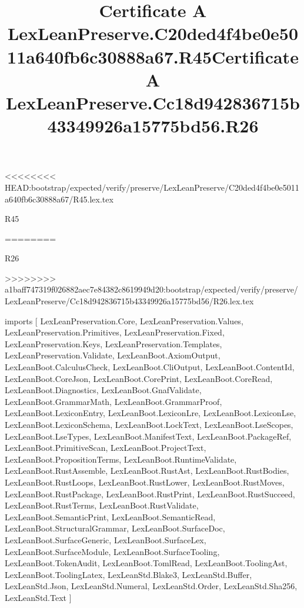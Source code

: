<<<<<<<< HEAD:bootstrap/expected/verify/preserve/LexLeanPreserve/C20ded4f4be0e5011a640fb6c30888a67/R45.lex.tex
\begin{lexlean}{R45}
\title{Certificate A LexLeanPreserve.C20ded4f4be0e5011a640fb6c30888a67.R45}
========
\begin{lexlean}{R26}
\title{Certificate A LexLeanPreserve.Cc18d942836715b43349926a15775bd56.R26}
>>>>>>>> a1baff747319f026882aec7e84382c8619949d20:bootstrap/expected/verify/preserve/LexLeanPreserve/Cc18d942836715b43349926a15775bd56/R26.lex.tex
\begin{coremodule}
imports [
  LexLeanPreservation.Core,
  LexLeanPreservation.Values,
  LexLeanPreservation.Primitives,
  LexLeanPreservation.Fixed,
  LexLeanPreservation.Keys,
  LexLeanPreservation.Templates,
  LexLeanPreservation.Validate,
  LexLeanBoot.AxiomOutput,
  LexLeanBoot.CalculusCheck,
  LexLeanBoot.CliOutput,
  LexLeanBoot.ContentId,
  LexLeanBoot.CoreJson,
  LexLeanBoot.CorePrint,
  LexLeanBoot.CoreRead,
  LexLeanBoot.Diagnostics,
  LexLeanBoot.GnafValidate,
  LexLeanBoot.GrammarMath,
  LexLeanBoot.GrammarProof,
  LexLeanBoot.LexiconEntry,
  LexLeanBoot.LexiconLre,
  LexLeanBoot.LexiconLse,
  LexLeanBoot.LexiconSchema,
  LexLeanBoot.LockText,
  LexLeanBoot.LseScopes,
  LexLeanBoot.LseTypes,
  LexLeanBoot.ManifestText,
  LexLeanBoot.PackageRef,
  LexLeanBoot.PrimitiveScan,
  LexLeanBoot.ProjectText,
  LexLeanBoot.PropositionTerms,
  LexLeanBoot.RuntimeValidate,
  LexLeanBoot.RustAssemble,
  LexLeanBoot.RustAst,
  LexLeanBoot.RustBodies,
  LexLeanBoot.RustLoops,
  LexLeanBoot.RustLower,
  LexLeanBoot.RustMoves,
  LexLeanBoot.RustPackage,
  LexLeanBoot.RustPrint,
  LexLeanBoot.RustSucceed,
  LexLeanBoot.RustTerms,
  LexLeanBoot.RustValidate,
  LexLeanBoot.SemanticPrint,
  LexLeanBoot.SemanticRead,
  LexLeanBoot.StructuralGrammar,
  LexLeanBoot.SurfaceDoc,
  LexLeanBoot.SurfaceGeneric,
  LexLeanBoot.SurfaceLex,
  LexLeanBoot.SurfaceModule,
  LexLeanBoot.SurfaceTooling,
  LexLeanBoot.TokenAudit,
  LexLeanBoot.TomlRead,
  LexLeanBoot.ToolingAst,
  LexLeanBoot.ToolingLatex,
  LexLeanStd.Blake3,
  LexLeanStd.Buffer,
  LexLeanStd.Json,
  LexLeanStd.Numeral,
  LexLeanStd.Order,
  LexLeanStd.Sha256,
  LexLeanStd.Text
]


\end{coremodule}
\end{lexlean}
\end{lexlean}
